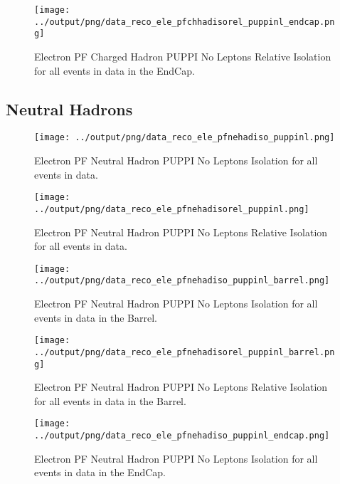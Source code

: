 \documentclass[11pt]{book}
\begin{document}
\begin{figure}[htb]
\centering
\texttt{[image: ../output/png/data\_reco\_ele\_pfchhadisorel\_puppinl\_endcap.png]}
\caption{Electron PF Charged Hadron PUPPI No Leptons Relative Isolation for all events in data in the EndCap.}
\label{fig:data_ele_pfchhadisorel_puppinl_endcap}
\end{figure}
\clearpage

\subsection{Neutral Hadrons}
\begin{figure}[htb]
\centering
\texttt{[image: ../output/png/data\_reco\_ele\_pfnehadiso\_puppinl.png]}
\caption{Electron PF Neutral Hadron PUPPI No Leptons Isolation for all events in data.}
\label{fig:data_ele_pfnehadiso_puppinl}
\end{figure}

\begin{figure}[htb]
\centering
\texttt{[image: ../output/png/data\_reco\_ele\_pfnehadisorel\_puppinl.png]}
\caption{Electron PF Neutral Hadron PUPPI No Leptons Relative Isolation for all events in data.}
\label{fig:data_ele_pfnehadisorel_puppinl}
\end{figure}

\begin{figure}[htb]
\centering
\texttt{[image: ../output/png/data\_reco\_ele\_pfnehadiso\_puppinl\_barrel.png]}
\caption{Electron PF Neutral Hadron PUPPI No Leptons Isolation for all events in data in the Barrel.}
\label{fig:data_ele_pfnehadiso_puppinl_barrel}
\end{figure}

\begin{figure}[htb]
\centering
\texttt{[image: ../output/png/data\_reco\_ele\_pfnehadisorel\_puppinl\_barrel.png]}
\caption{Electron PF Neutral Hadron PUPPI No Leptons Relative Isolation for all events in data in the Barrel.}
\label{fig:data_ele_pfnehadisorel_puppinl_barrel}
\end{figure}

\begin{figure}[htb]
\centering
\texttt{[image: ../output/png/data\_reco\_ele\_pfnehadiso\_puppinl\_endcap.png]}
\caption{Electron PF Neutral Hadron PUPPI No Leptons Isolation for all events in data in the EndCap.}
\label{fig:data_ele_pfnehadiso_puppinl_endcap}
\end{figure}
\end{document}
